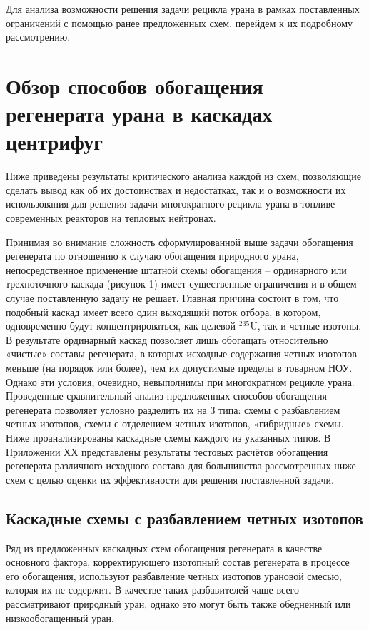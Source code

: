Для анализа возможности решения задачи рецикла урана в рамках поставленных ограничений с помощью ранее предложенных схем, перейдем к их подробному рассмотрению.

\section{Обзор способов обогащения регенерата урана в каскадах центрифуг}

Ниже приведены результаты критического анализа каждой из схем, позволяющие сделать вывод как об их достоинствах и недостатках, так и о возможности их использования для решения задачи многократного рецикла урана в топливе современных реакторов на тепловых нейтронах.

Принимая во внимание сложность сформулированной выше задачи обогащения регенерата по отношению к случаю обогащения природного урана, непосредственное применение штатной схемы обогащения -- ординарного или трехпоточного каскада (рисунок 1) имеет существенные ограничения и в общем случае поставленную задачу не решает. Главная причина состоит в том, что подобный каскад имеет всего один выходящий поток отбора, в котором, одновременно будут концентрироваться, как целевой  $^{235}$U, так и четные изотопы. В результате ординарный каскад позволяет лишь обогащать относительно «чистые» составы регенерата, в которых исходные содержания четных изотопов меньше (на порядок или более), чем их допустимые пределы в товарном НОУ. Однако эти условия, очевидно, невыполнимы при многократном рецикле урана.
Проведенные сравнительный анализ предложенных способов обогащения регенерата позволяет условно разделить их на 3 типа: схемы с разбавлением четных изотопов,  схемы с отделением четных изотопов, «гибридные» схемы. 
Ниже проанализированы каскадные схемы каждого из указанных типов. В Приложении ХХ представлены результаты тестовых расчётов обогащения регенерата различного исходного состава для большинства рассмотренных ниже схем с целью оценки их эффективности для решения поставленной задачи.

\subsection{Каскадные схемы с разбавлением четных изотопов}

Ряд из предложенных каскадных схем обогащения регенерата в качестве основного фактора, корректирующего изотопный состав регенерата в процессе его обогащения, используют разбавление четных изотопов урановой смесью, которая их не содержит. В качестве таких разбавителей чаще всего рассматривают природный уран, однако это могут быть также обедненный или низкообогащенный уран.

